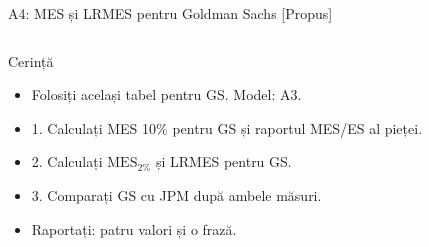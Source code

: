 \begin{frame}{A4: MES și LRMES pentru Goldman Sachs [Propus]}
\propsub
\itemsize{\scriptsize}
\begin{columns}[T]
\begin{column}{\taskw}
\begin{block}{Cerință}
\begin{itemize}
    \item Folosiți același tabel pentru GS. Model: A3.
    \item 1. Calculați MES 10\% pentru GS și raportul MES/ES al pieței.
    \item 2. Calculați $\mathrm{MES}_{2\%}$ și LRMES pentru GS.
    \item 3. Comparați GS cu JPM după ambele măsuri.
    \item Raportați: patru valori și o frază.
\end{itemize}
\end{block}
\end{column}
\begin{column}{\solw}
\end{column}
\end{columns}
\end{frame}

